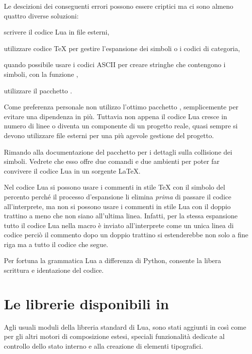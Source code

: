 Le descizioni dei conseguenti errori possono essere criptici ma ci sono almeno
quattro diverse soluzioni:
\begin{compactitemize}
\item scrivere il codice Lua in file esterni,
\item utilizzare codice \TeX{} per gestire l'espansione dei simboli o i codici
di categoria,
\item quando possibile usare i codici ASCII per creare stringhe che contengono
i simboli, con la funzione ,
\item utilizzare il pacchetto .
\end{compactitemize}

Come preferenza personale non utilizzo l'ottimo pacchetto ,
semplicemente per evitare una dipendenza in più. Tuttavia non appena il codice
Lua cresce in numero di linee o diventa un componente di un progetto reale,
quasi sempre si devono utilizzare file esterni per una più agevole gestione del
progetto.

Rimando alla documentazione del pacchetto  per i dettagli sulla
collisione dei simboli. Vedrete che esso offre due comandi e due ambienti per
poter far convivere il codice Lua in un sorgente \LaTeX.

Nel codice Lua si possono usare i commenti in stile \TeX{} con il simbolo del
percento perché il processo d'espansione li elimina \emph{prima} di passare il
codice all'interprete, ma non si possono usare i commenti in stile Lua con il
doppio trattino a meno che non siano all'ultima linea. Infatti, per la stessa
espansione tutto il codice Lua nella macro  è inviato
all'interprete come un unica linea di codice perciò il commento dopo un doppio
trattino si estenderebbe non solo a fine riga ma a tutto il codice che segue.

Per fortuna la grammatica Lua a differenza di Python, consente la libera
scrittura e identazione del codice.


\section{Le librerie disponibili in \LuaTeX}

Agli usuali moduli della libreria standard di Lua, sono stati aggiunti in
\LuaTeX{} così come per gli altri motori di composizione estesi, speciali
funzionalità dedicate al controllo dello stato interno e alla creazione di
elementi tipografici.


